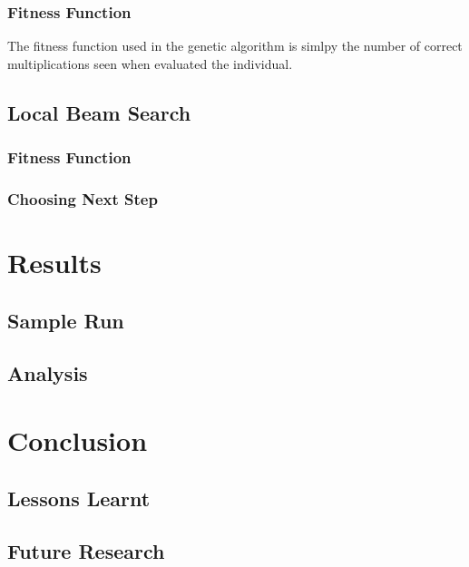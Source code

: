 \documentclass[12pt]{article}
\begin{document}
\subsubsection{Fitness Function}
The fitness function used in the genetic algorithm is simlpy the number of correct multiplications seen when evaluated the individual.

\subsection{Local Beam Search}
\subsubsection{Fitness Function}
\subsubsection{Choosing Next Step}


\section{Results}
\subsection{Sample Run}
\subsection{Analysis}


\section{Conclusion}
\subsection{Lessons Learnt}
\subsection{Future Research}
\end{document}
